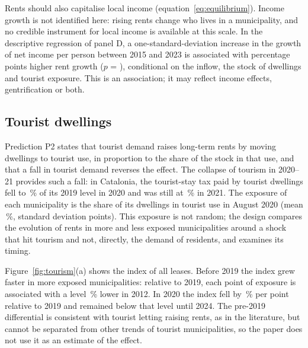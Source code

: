 \documentclass[11pt,a4paper]{article}
\begin{document}
Rents should also capitalise local income (equation~\ref{eq:equilibrium}). Income growth is not identified here: rising rents change who lives in a municipality, and no credible instrument for local income is available at this scale. In the descriptive regression of panel D, a one-standard-deviation increase in the growth of net income per person between 2015 and 2023 is associated with \bInc{} percentage points higher rent growth ($p$ = \bIncP), conditional on the inflow, the stock of dwellings and tourist exposure. This is an association; it may reflect income effects, gentrification or both.

\subsection{Tourist dwellings}

Prediction P2 states that tourist demand raises long-term rents by moving dwellings to tourist use, in proportion to the share of the stock in that use, and that a fall in tourist demand reverses the effect. The collapse of tourism in 2020--21 provides such a fall: in Catalonia, the tourist-stay tax paid by tourist dwellings fell to \ieetTwenty\,\% of its 2019 level in 2020 and was still at \ieetTwentyOne\,\% in 2021. The exposure of each municipality is the share of its dwellings in tourist use in August 2020 (mean \expMean\,\%, standard deviation \expSd{} points). This exposure is not random; the design compares the evolution of rents in more and less exposed municipalities around a shock that hit tourism and not, directly, the demand of residents, and examines its timing.

Figure~\ref{fig:tourism}(a) shows the index of all leases. Before 2019 the index grew faster in more exposed municipalities: relative to 2019, each point of exposure is associated with a level \ipvaEvTwelve\,\% lower in 2012. In 2020 the index fell by \ipvaEvTwenty\,\% per point relative to 2019 and remained below that level until 2024. The pre-2019 differential is consistent with tourist letting raising rents, as in the literature, but cannot be separated from other trends of tourist municipalities, so the paper does not use it as an estimate of the effect.
\end{document}
